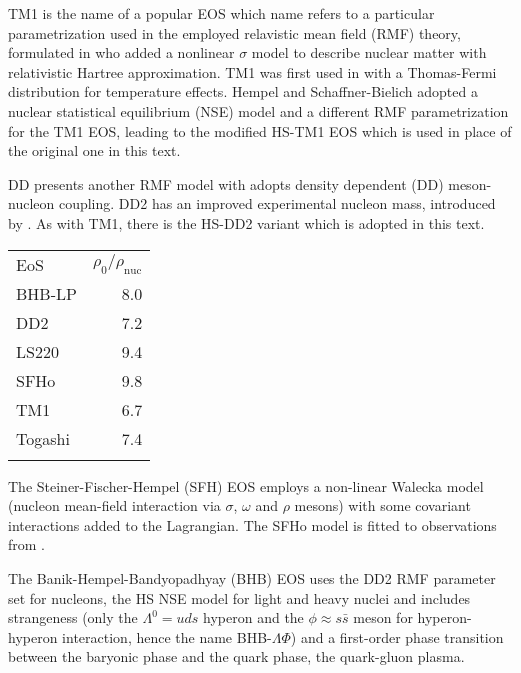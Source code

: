 TM1 is the name of a popular EOS which name refers to a particular
parametrization used in the employed relavistic mean field (RMF) theory,
formulated in \cite{Sugahara1993} who added a nonlinear $\sigma$ model
to describe nuclear matter with relativistic Hartree approximation.
TM1 was first used in \cite{Lattimer91,Typel2010} with a Thomas-Fermi
distribution for temperature effects. Hempel and Schaffner-Bielich
adopted a nuclear statistical equilibrium (NSE) model and a different
RMF parametrization for the TM1 EOS, leading to the modified
HS-TM1 EOS \cite{Hempel2010,Hempel2012} which is used in place of the 
original one in this text.

DD \cite{Typel2005} presents another RMF model with adopts density dependent (DD)
meson-nucleon coupling. DD2 has an improved experimental nucleon mass,
introduced by \cite{Typel2010}. As with TM1, there is the HS-DD2 variant
\cite{Hempel2012} which is adopted in this text.
\begin{margintable}
	\centering
	\begin{tabular}{lr}
		\toprule
		EoS
		& $\rho_0 / \rho_\text{nuc}$
		\\
		\colrule
		BHB-LP  &  8.0 \\
		DD2     &  7.2 \\
		LS220   &  9.4 \\
		SFHo    &  9.8 \\
		TM1     &  6.7 \\
		Togashi &  7.4 \\
		\botrule
	\end{tabular}
	\caption[
	  Nuclear EOS, small table: Central energy density and pressure
	]{Central energy density $\rho_0$ of the maximum nonrotating mass star,
		in units of the nuclear
		saturation density $\rho_\text{nuc} = 2.7\times 10^{11}$kg/m$^3$ for
		the EOS discussed in section~\ref{sec:bnslt-motivation}. See table
		\protect\ref{table:eos-properties} for further properies.
	}\label{table:EOS-nuclear-properties}
\end{margintable}

The Steiner-Fischer-Hempel (SFH) EOS \cite{Steiner2013} employs a non-linear
Wal\-ecka model (nucleon mean-field interaction via $\sigma$, $\omega$ and $\rho$
mesons) with some covariant interactions added to the Lagrangian. The SFHo
model is fitted to observations from \cite{Steiner2010}.

The Banik-Hempel-Bandyopadhyay (BHB) EOS \cite{Banik2014} uses the DD2 RMF
parameter set for nucleons, the HS NSE model for light and heavy nuclei and
includes strangeness (only the $\Lambda^0=uds$ hyperon and the
$\phi\approx s\bar s$ meson for hyperon-hyperon interaction, hence the name
BHB-$\Lambda\Phi$) and a first-order phase transition between the baryonic phase
and the quark phase, \ie the quark-gluon plasma.


